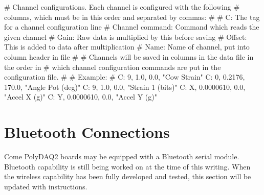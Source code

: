 \begin{DoxyItemize}
\begin{DoxyCode}
\textcolor{preprocessor}{# Channel configurations.  Each channel is configured with the following}
\textcolor{preprocessor}{}\textcolor{preprocessor}{# columns, which must be in this order and separated by commas:}
\textcolor{preprocessor}{}\textcolor{preprocessor}{#}
\textcolor{preprocessor}{}\textcolor{preprocessor}{# C:                The tag for a channel configuration line}
\textcolor{preprocessor}{}\textcolor{preprocessor}{# Channel command:  Command which reads the given channel}
\textcolor{preprocessor}{}\textcolor{preprocessor}{# Gain:             Raw data is multiplied by this before saving}
\textcolor{preprocessor}{}\textcolor{preprocessor}{# Offset:           This is added to data after multiplication}
\textcolor{preprocessor}{}\textcolor{preprocessor}{# Name:             Name of channel, put into column header in file}
\textcolor{preprocessor}{}\textcolor{preprocessor}{#}
\textcolor{preprocessor}{}\textcolor{preprocessor}{# Channels will be saved in columns in the data file in the order in}
\textcolor{preprocessor}{}\textcolor{preprocessor}{# which channel configuration commands are put in the configuration file.}
\textcolor{preprocessor}{}\textcolor{preprocessor}{#}
\textcolor{preprocessor}{}\textcolor{preprocessor}{# Example:}
\textcolor{preprocessor}{}\textcolor{preprocessor}{#   C: 9, 1.0, 0.0, "Cow Strain"}
\textcolor{preprocessor}{}
C: 0, 0.2176, 170.0, \textcolor{stringliteral}{"Angle Pot (deg)"}
C: 9, 1.0, 0.0, \textcolor{stringliteral}{"Strain 1 (bits)"}
C: X, 0.0000610, 0.0, \textcolor{stringliteral}{"Accel X (g)"}
C: Y, 0.0000610, 0.0, \textcolor{stringliteral}{"Accel Y (g)"}
\end{DoxyCode}

\end{DoxyItemize}\hypertarget{pd_setup_pds_blue}{}\section{Bluetooth Connections}\label{pd_setup_pds_blue}
Come Poly\-D\-A\-Q2 boards may be equipped with a Bluetooth serial module. Bluetooth capability is still being worked on at the time of this writing. When the wireless capability has been fully developed and tested, this section will be updated with instructions. 